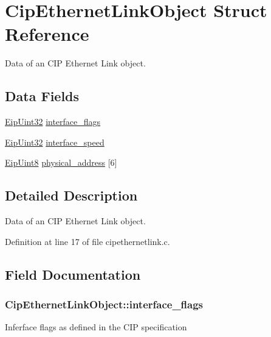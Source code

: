 \hypertarget{structCipEthernetLinkObject}{\section{\-Cip\-Ethernet\-Link\-Object \-Struct \-Reference}
\label{d8/d13/structCipEthernetLinkObject}
}


\-Data of an \-C\-I\-P \-Ethernet \-Link object.  


\subsection*{\-Data \-Fields}
\begin{DoxyCompactItemize}
\item 
\hyperlink{typedefs_8h_abf2dd49262551294eb990ef8746a2767}{\-Eip\-Uint32} \hyperlink{structCipEthernetLinkObject_a353eee07bb6c92bcd5583e94122ef21a}{interface\-\_\-flags}
\item 
\hyperlink{typedefs_8h_abf2dd49262551294eb990ef8746a2767}{\-Eip\-Uint32} \hyperlink{structCipEthernetLinkObject_a786d0470c5139d906db04cf338e9e49a}{interface\-\_\-speed}
\item 
\hyperlink{typedefs_8h_aa0c108ee762a27720919a4634643040e}{\-Eip\-Uint8} \hyperlink{structCipEthernetLinkObject_a4a91c0cca43031b628001583f6ce3f63}{physical\-\_\-address} \mbox{[}6\mbox{]}
\end{DoxyCompactItemize}


\subsection{\-Detailed \-Description}
\-Data of an \-C\-I\-P \-Ethernet \-Link object. 

\-Definition at line 17 of file cipethernetlink.\-c.



\subsection{\-Field \-Documentation}
\hypertarget{structCipEthernetLinkObject_a353eee07bb6c92bcd5583e94122ef21a}{
\subsubsection[{interface\-\_\-flags}]{ {\bf \-Cip\-Ethernet\-Link\-Object\-::interface\-\_\-flags}}}\label{d8/d13/structCipEthernetLinkObject_a353eee07bb6c92bcd5583e94122ef21a}
\-Inferface flags as defined in the \-C\-I\-P specification 

